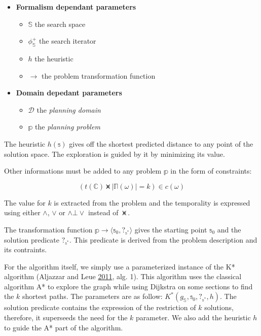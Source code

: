 \documentclass[11pt,a4paper,twoside,openright,titlepage,numbers=noenddot,headinclude,cleardoublepage=empty,openany]{scrreprt}
\theoremstyle{plain}
\theoremstyle{definition}
\theoremstyle{remark}
\providecommand{\tightlist}{%
  \setlength{\itemsep}{0pt}\setlength{\parskip}{0pt}}
\newcommand{\bb}{\mathbb}
\renewcommand{\cal}{\mathcal}
\begin{document}
\begin{itemize}
\tightlist
\item
  \textbf{Formalism dependant parameters}

  \begin{itemize}
  \tightlist
  \item
    \(\bb{S}\) the search space
  \item
    \(\phi^+_{\bb{S}}\) the search iterator
  \item
    \(h\) the heuristic
  \item
    \(\to\) the problem transformation function
  \end{itemize}
\item
  \textbf{Domain depedant parameters}

  \begin{itemize}
  \tightlist
  \item
    \(\cal{D}\) the \emph{planning domain}
  \item
    \(\bb{p}\) the \emph{planning problem}
  \end{itemize}
\end{itemize}

The heuristic \(h(\bb{s})\) gives off the shortest predicted distance to
any point of the solution space. The exploration is guided by it by
minimizing its value.

Other informations must be added to any problem \(\bb{p}\) in the form
of constraints:

\[\left( t(\bb{C}) \veeonwedge |\bb{\Pi}(\omega)| = k \right) \in c(\omega)\]

The value for \(k\) is extracted from the problem and the temporality is
expressed using either \(\land\), \(\lor\) or \(\land \bot \lor\)
instead of \(\veeonwedge\).

The transformation function
\(\bb{p} \to \langle \bb{s}_0, ?_{\bb{s}^*} \rangle\) gives the starting
point \(\bb{s}_0\) and the solution predicate \(?_{\bb{s}^*}\). This
predicate is derived from the problem description and its contraints.

For the algorithm itself, we simply use a parameterized instance of the
K* algorithm (Aljazzar and Leue
\protect\hyperlink{ref-aljazzar_heuristic_2011}{2011}, alg. 1). This
algorithm uses the classical algorithm A* to explore the graph while
using Dijkstra on some sections to find the \(k\) shortest paths. The
parameters are as follow:
\(K^*(g_{\bb{S}}, \bb{s}_0, ?_{\bb{s}^*}, h)\). The solution predicate
contains the expression of the restriction of \(k\) solutions,
therefore, it superseeds the need for the \(k\) parameter. We also add
the heuristic \(h\) to guide the A* part of the algorithm.
\end{document}
